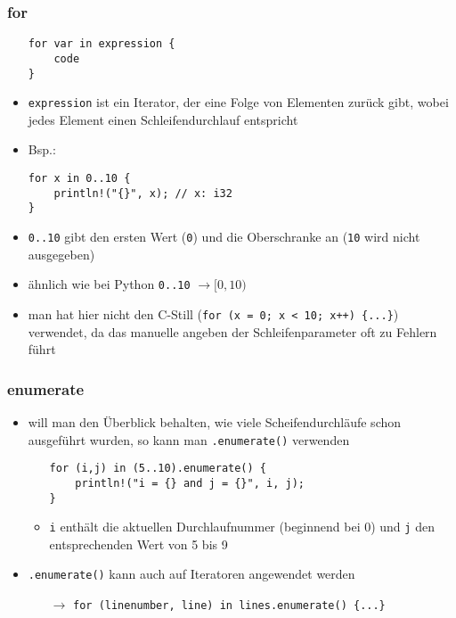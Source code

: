 \documentclass[a4paper,12pt]{article}
\begin{document}
\subsubsection*{for}
\begin{itemize}
  \item[]
\begin{verbatim}
for var in expression {
    code
}
\end{verbatim}
  \item \verb|expression| ist ein Iterator, der eine Folge von Elementen zurück gibt, wobei jedes Element einen Schleifendurchlauf entspricht 
  \item Bsp.:
\begin{verbatim}
for x in 0..10 {
    println!("{}", x); // x: i32
}
\end{verbatim}
	\item \verb|0..10| gibt den ersten Wert (\verb|0|) und die Oberschranke an  (\verb|10| wird nicht ausgegeben)
	\item ähnlich wie bei Python \verb|0..10| $\rightarrow [0,10)$ 
	\item man hat hier nicht den C-Still (\verb|for (x = 0; x < 10; x++) {...}|) verwendet, da das manuelle angeben der Schleifenparameter oft zu Fehlern führt
	\end{itemize}
\subsubsection*{enumerate}
\begin{itemize}
	  \item will man den Überblick behalten, wie viele Scheifendurchläufe schon ausgeführt wurden, so kann man \verb|.enumerate()| verwenden
	  \begin{itemize}
	      \item[] 
\begin{verbatim}
for (i,j) in (5..10).enumerate() {
    println!("i = {} and j = {}", i, j);
}
\end{verbatim} 
		\item \verb|i| enthält die aktuellen Durchlaufnummer (beginnend bei 0) und \verb|j| den entsprechenden Wert von 5 bis 9
	  \end{itemize}
 \item \verb|.enumerate()| kann auch auf Iteratoren angewendet werden
 \begin{itemize}
     \item[$\rightarrow$] \verb|for (linenumber, line) in lines.enumerate() {...}| 
 \end{itemize}
	\end{itemize}
	
\end{document}
